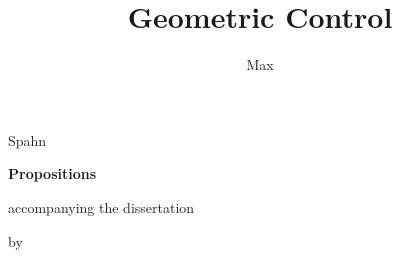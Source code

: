 \documentclass[nativefonts]{TUD-dissertation2020}
\newcommand{\addmytitle}{\title[\textcolor{tudelft-cyan}{Coupled Local Motion
Planning for Mobile Manipulators}]{Geometric Control}}
\begin{document}
\addmytitle
\author{Max}{Spahn}

\begin{center}

{\Large\titlefont\bfseries Propositions}

\bigskip

accompanying the dissertation

\bigskip

{\makeatletter
\titlestyle\bfseries\large\@title
\makeatother}

{\makeatletter
\ifx\@subtitle\undefined\else
    \titlefont\titleshape\@subtitle
\fi
\makeatother}

\bigskip

by

\bigskip

\makeatletter
{\large\titlefont\bfseries\@firstname\ {\titleshape\@lastname}}
\makeatother

\end{center}

\bigskip
\bigskip
\end{document}
